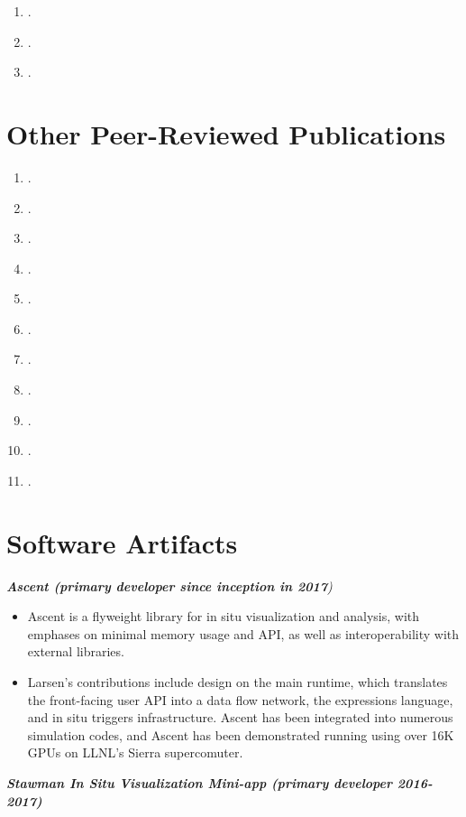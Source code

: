 \documentclass[margin,line]{res}
\begin{document}
\begin{resume}
\begin{enumerate}
	\item {}.
	\item {}.
	\item {}.
	

\end{enumerate}
\section{\sc Other Peer-Reviewed Publications}
\begin{enumerate}[resume]
	\item {}.
	\item {}.
	\item {}.
	\item {}.
	\item {}.
	\item {}.
	\item {}.
	\item {}.
	\item {}.
	\item {}.
	\item {}.
\end{enumerate}

\section{\sc Software Artifacts}
{\em \textbf{Ascent (primary developer since inception in 2017}) }
\begin{itemize}
	\item Ascent is a flyweight library for in situ visualization and analysis, with emphases on minimal
	memory usage and API, as well as interoperability with external libraries.
	\item Larsen's contributions include design on the main runtime, which translates the front-facing user API into a data flow network, the expressions language, and in situ triggers infrastructure. Ascent has been integrated into numerous simulation codes, and Ascent has been demonstrated running using over 16K GPUs on LLNL's Sierra supercomuter.
\end{itemize}

{\em \textbf{Stawman In Situ Visualization Mini-app (primary developer 2016-2017)} }


\end{resume}
\end{document}
